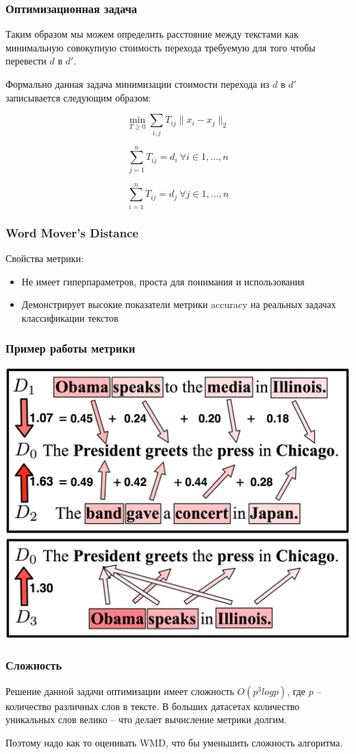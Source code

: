 \documentclass{beamer}
\begin{document}
\begin{frame}
\frametitle{Оптимизационная задача}

Таким образом мы можем определить расстояние между текстами как минимальную совокупную стоимость перехода требуемую для того чтобы перевести $d$ в $d'$.

Формально данная задача минимизации стоимости перехода из $d$ в $d'$ записывается следующим образом:

$$
\min_{T \geq 0} \sum_{i,j} T_{ij} \| x_i - x_j\|_2
$$

$$
\sum_{j = 1}^n T_{ij} = d_i\  \forall i \in {1, ..., n}
$$

$$
\sum_{i = 1}^n T_{ij} = d_j\  \forall j \in {1, ..., n}
$$


\end{frame}




\begin{frame}
\frametitle{Word Mover's Distance}
Свойства метрики:
\begin{itemize}
\item Не имеет гиперпараметров, проста для понимания и использования
\item Демонстрирует высокие показатели метрики accuracy на реальных задачах классификации текстов
\end{itemize}
\end{frame}

\begin{frame}
\frametitle{Пример работы метрики}
\includegraphics[width=0.7 \textwidth]{1.png}

\end{frame}

\begin{frame}
\frametitle{Сложность}

Решение данной задачи оптимизации имеет сложность $O(p^3log p)$, где $p$ -- количество различных слов в тексте. В больших датасетах количество уникальных слов велико -- что делает вычисление метрики долгим.

Поэтому надо как то оценивать WMD, что бы уменьшить сложность алгоритма.


\end{frame}
\end{document}
